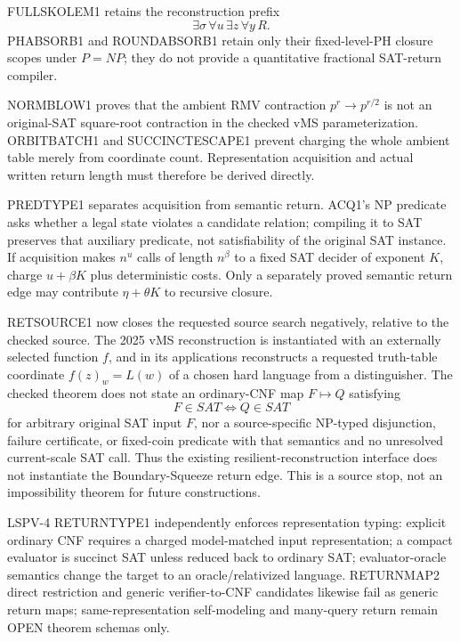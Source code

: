 \documentclass[11pt]{article}
\begin{document}
FULLSKOLEM1 retains the reconstruction prefix
\[
\exists\sigma\,\forall u\,\exists z\,\forall y\,R.
\]
PHABSORB1 and ROUNDABSORB1 retain only their fixed-level-PH closure scopes under \(P=NP\); they do not provide a quantitative fractional SAT-return compiler.

NORMBLOW1 proves that the ambient RMV contraction \(p^r\to p^{r/2}\) is not an original-SAT square-root contraction in the checked vMS parameterization. ORBITBATCH1 and SUCCINCTESCAPE1 prevent charging the whole ambient table merely from coordinate count. Representation acquisition and actual written return length must therefore be derived directly.

PREDTYPE1 separates acquisition from semantic return. ACQ1's NP predicate asks whether a legal state violates a candidate relation; compiling it to SAT preserves that auxiliary predicate, not satisfiability of the original SAT instance. If acquisition makes \(n^u\) calls of length \(n^\beta\) to a fixed SAT decider of exponent \(K\), charge \(u+\beta K\) plus deterministic costs. Only a separately proved semantic return edge may contribute \(\eta+\theta K\) to recursive closure.

RETSOURCE1 now closes the requested source search negatively, relative to the checked source. The 2025 vMS reconstruction is instantiated with an externally selected function \(f\), and in its applications reconstructs a requested truth-table coordinate \(f(z)_w=L(w)\) of a chosen hard language from a distinguisher. The checked theorem does not state an ordinary-CNF map \(F\mapsto Q\) satisfying
\[
F\in SAT\iff Q\in SAT
\]
for arbitrary original SAT input \(F\), nor a source-specific NP-typed disjunction, failure certificate, or fixed-coin predicate with that semantics and no unresolved current-scale SAT call. Thus the existing resilient-reconstruction interface does not instantiate the Boundary-Squeeze return edge. This is a source stop, not an impossibility theorem for future constructions.

LSPV-4 RETURNTYPE1 independently enforces representation typing: explicit ordinary CNF requires a charged model-matched input representation; a compact evaluator is succinct SAT unless reduced back to ordinary SAT; evaluator-oracle semantics change the target to an oracle/relativized language. RETURNMAP2 direct restriction and generic verifier-to-CNF candidates likewise fail as generic return maps; same-representation self-modeling and many-query return remain OPEN theorem schemas only.
\end{document}
